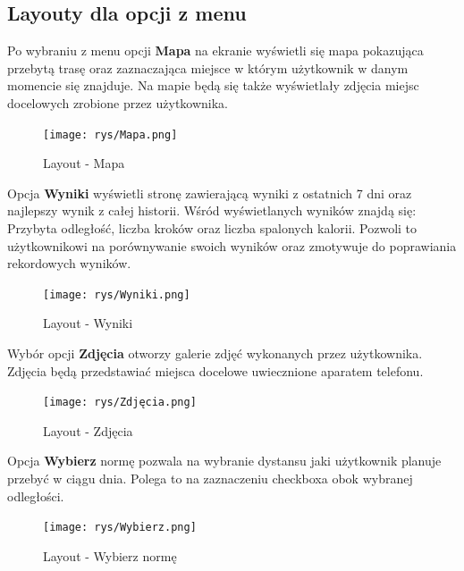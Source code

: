 \subsection{Layouty dla opcji z menu}
Po wybraniu z menu opcji \textbf{Mapa} na ekranie wyświetli się mapa pokazująca przebytą trasę oraz zaznaczająca miejsce w którym użytkownik w danym momencie się znajduje.
Na mapie będą się także wyświetlały zdjęcia miejsc docelowych zrobione przez użytkownika.
\begin{figure}[!htb]
	\begin{center}
		\texttt{[image: rys/Mapa.png]}
		\caption{Layout - Mapa}
		\label{rys:rysunek003}
	\end{center}
\end{figure}
\newline Opcja \textbf{Wyniki} wyświetli stronę zawierającą wyniki z ostatnich 7 dni oraz najlepszy wynik z całej historii. Wśród wyświetlanych wyników znajdą się: Przybyta odległość, liczba kroków oraz liczba spalonych kalorii. Pozwoli to użytkownikowi na porównywanie swoich wyników oraz zmotywuje do poprawiania rekordowych wyników.
\begin{figure}[!htb]
	\begin{center}
		\texttt{[image: rys/Wyniki.png]}
		\caption{Layout - Wyniki}
		\label{rys:rysunek004}
	\end{center}
\end{figure}
\newline Wybór opcji \textbf{Zdjęcia} otworzy galerie zdjęć wykonanych przez użytkownika. Zdjęcia będą przedstawiać miejsca docelowe uwiecznione aparatem telefonu.
\begin{figure}[!htb]
	\begin{center}
		\texttt{[image: rys/Zdjęcia.png]}
		\caption{Layout - Zdjęcia}
		\label{rys:rysunek005}
	\end{center}
\end{figure}
\newline
\newline Opcja \textbf{Wybierz} normę pozwala na wybranie dystansu jaki użytkownik planuje przebyć w ciągu dnia. Polega to na zaznaczeniu checkboxa obok wybranej odległości.
\begin{figure}[!htb]
	\begin{center}
		\texttt{[image: rys/Wybierz.png]}
		\caption{Layout - Wybierz normę}
		\label{rys:rysunek006}
	\end{center}
\end{figure}
 
